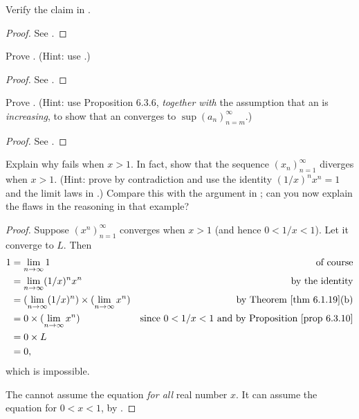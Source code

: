 \exercisesection

\begin{exercise} \label{exercise 6.3.1}
Verify the claim in .
\end{exercise}

\begin{proof}
See .
\end{proof}

\begin{exercise} \label{exercise 6.3.2}
Prove . (Hint: use .)
\end{exercise}

\begin{proof}
See .
\end{proof}

\begin{exercise} \label{exercise 6.3.3}
Prove .
(Hint: use Proposition 6.3.6, \emph{together with} the assumption that an is \emph{increasing}, to show that an converges to \(\sup(a_n)_{n = m}^{\infty}\).)
\end{exercise}

\begin{proof}
See .
\end{proof}

\begin{exercise} \label{exercise 6.3.4}
Explain why  fails when \(x > 1\).
In fact, show that the sequence \((x_n)_{n = 1}^{\infty}\) diverges when \(x > 1\).
(Hint: prove by contradiction and use the identity \((1/x)^n x^n = 1\) and the limit laws in .)
Compare this with the argument in ; can you now explain the flaws in the reasoning in that example?
\end{exercise}

\begin{proof}
Suppose \((x^n)_{n = 1}^{\infty}\) converges when \(x > 1\) (and hence \(0 < 1/x < 1\)).
Let it converge to \(L\).
Then
\begin{align*}
    1 & = \lim_{n \toINF} 1 & \text{of course} \\
      & = \lim_{n \toINF} (1/x)^n x^n & \text{by the identity} \\
      & = (\lim_{n \toINF} (1/x)^n) \X (\lim_{n \toINF} x^n) & \text{by \THM{6.1.19}(b)} \\
      & = 0 \X (\lim_{n \toINF} x^n) & \text{since \(0 < 1/x < 1\) and by \PROP{6.3.10}} \\
      & = 0 \X L \\
      & = 0,
\end{align*}
which is impossible.

The  cannot assume the equation \emph{for all} real number \(x\).
It can assume the equation for \(0 < x < 1\), by .
\end{proof}
